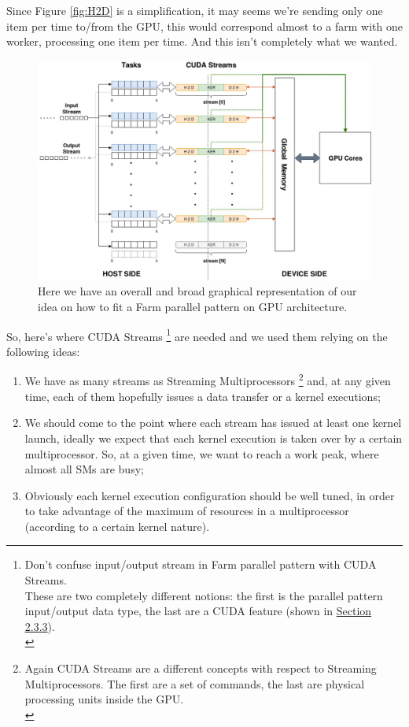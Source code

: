 	Since Figure \ref{fig:H2D} is a simplification, it may seems we're sending only one item per time to/from the GPU, this would correspond almost to a farm with one worker, processing one item per time. And this isn't completely what we wanted.\\
	\begin{figure}
		\vspace{-2cm}
		\includegraphics[scale=0.62,angle=-90]{images/overallLogic.jpg}
		\caption{Here we have an overall and broad graphical representation of our idea on how to fit a Farm parallel pattern on GPU architecture.}
		\label{fig:overallLogic}
	\end{figure}
	So, here's where CUDA Streams \footnote{Don't confuse input/output stream in Farm parallel pattern with CUDA Streams.\\ These are two completely different notions: the first is the parallel pattern input/output data type, the last are a CUDA feature (shown in \hyperref[subs:streams]{Section 2.3.3}).\\} are needed and we used them relying on the following ideas:
	\begin{enumerate}
		\item We have as many streams as Streaming Multiprocessors \footnote{Again CUDA Streams are a different concepts with respect to Streaming Multiprocessors. The first are a set of commands, the last are physical processing units inside the GPU.\\} and, at any given time, each of them hopefully issues a data transfer or a kernel executions;
		\item We should come to the point where each stream has issued at least one kernel launch, ideally we expect that each kernel execution is taken over by a certain multiprocessor. So, at a given time, we want to reach a work peak, where almost all SMs are busy;
		\item Obviously each kernel execution configuration should be well tuned, in order to take advantage of the maximum of resources in a multiprocessor (according to a certain kernel nature). 
	\end{enumerate}
	

